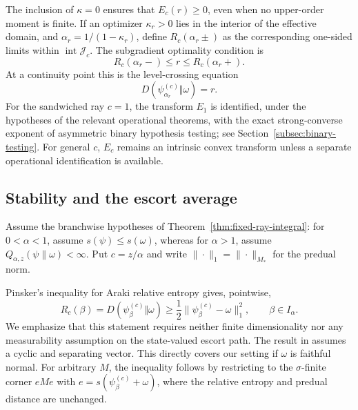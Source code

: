 \documentclass[12pt]{article}
\numberwithin{equation}{section}
\theoremstyle{definition}
\theoremstyle{remark}
\newcommand{\?}{\overset{?}{=}}
\begin{document}
The inclusion of $\kappa=0$ ensures that $E_c(r)\geq0$, even when no
upper-order moment is finite.  If an optimizer $\kappa_r>0$ lies in the
interior of the effective domain, and $\alpha_r=1/(1-\kappa_r)$, define
$R_c(\alpha_r\pm)$ as the corresponding one-sided limits within
$\operatorname{int}\mathcal J_c$.  The subgradient optimality condition is
\begin{equation}
  R_c(\alpha_r-)
  \leq r\leq R_c(\alpha_r+).
  \label{eq:nonsmooth-level-crossing}
\end{equation}
At a continuity point this is the level-crossing equation
\begin{equation}
  D(\psi_{\alpha_r}^{(c)}\Vert\omega)=r.
  \label{eq:smooth-level-crossing}
\end{equation}
For the sandwiched ray \(c=1\), the transform \(E_1\) is identified,
under the hypotheses of the relevant operational theorems, with the exact
strong-converse exponent of asymmetric binary hypothesis testing; see
Section~\ref{subsec:binary-testing}.
For general \(c\), \(E_c\) remains an intrinsic convex transform unless a
separate operational identification is available.



\subsection{Stability and the escort average}

Assume the branchwise hypotheses of
Theorem~\ref{thm:fixed-ray-integral}: for \(0<\alpha<1\), assume
\(s(\psi)\leq s(\omega)\), whereas for \(\alpha>1\), assume
\(Q_{\alpha,z}(\psi\|\omega)<\infty\).  Put \(c=z/\alpha\) and write
\(\|\cdot\|_1=\|\cdot\|_{M_*}\) for the predual norm.

Pinsker's inequality for Araki relative entropy \cite[Theorem~3.1]{Hiai1981SufficiencyKC} gives, pointwise,
\begin{equation}
  R_c(\beta)
  =
  D(\psi_\beta^{(c)}\Vert\omega)
  \geq
  \frac12
  \|\psi_\beta^{(c)}-\omega\|_1^2,
  \qquad \beta\in I_\alpha .
  \label{eq:escort-pinsker-pointwise}
\end{equation}
We emphasize that this statement requires neither finite dimensionality nor any
measurability assumption on the state-valued escort path. The result in \cite{Hiai1981SufficiencyKC} assumes a cyclic and separating vector. This directly covers our setting if $\omega$ is faithful normal. For arbitrary $M$, the inequality follows by restricting to the $\sigma$-finite corner $eMe$ with $e=s(\psi_\beta^{(c)}+\omega)$, where the relative entropy and predual distance are unchanged.
\end{document}
